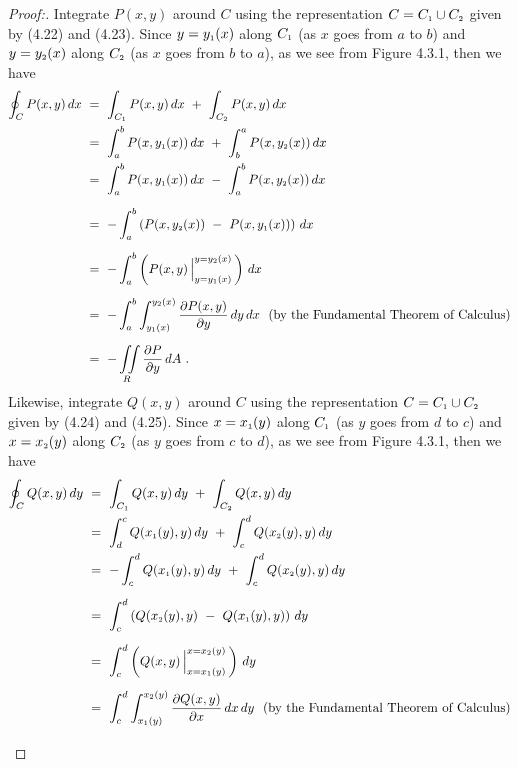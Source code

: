 \begin{proofbar}
\begin{proof}[Proof:]
 \par\noindent Integrate $P(x,y)$ around $C$ using the representation $C = C_{\scriptscriptstyle 1} \cup C_{\scriptscriptstyle 2}$ given by (4.22)
 and (4.23).
\newpage
\noindent Since $y = y_{\scriptscriptstyle 1}(x)$ along $C_{\scriptscriptstyle 1}$ (as $x$ goes from $a$ to $b$) and $y = y_{\scriptscriptstyle 2}(x)$ along
 $C_{\scriptscriptstyle 2}$ (as $x$ goes from $b$ to $a$), as we see from Figure 4.3.1, then we have
 \begin{align*}
  \oint_C P(x,y)\,dx ~&=~ \int_{C_{\scriptscriptstyle 1}} P(x,y)\,dx ~+~ \int_{C_{\scriptscriptstyle 2}} P(x,y)\,dx\\
   &=~ \int_a^b P(x,y_{\scriptscriptstyle 1}(x))\,dx ~+~ \int_b^a P(x,y_{\scriptscriptstyle 2}(x))\,dx\\
   &=~ \int_a^b P(x,y_{\scriptscriptstyle 1}(x))\,dx ~-~ \int_a^b P(x,y_{\scriptscriptstyle 2}(x))\,dx\\[6pt]
   &=~ -\int_a^b \left( P(x,y_{\scriptscriptstyle 2}(x)) ~-~ P(x,y_{\scriptscriptstyle 1}(x)) \right)\,dx\\[6pt]
   &=~ -\int_a^b \left( P(x,y) \,\Big|_{y = y_{\scriptscriptstyle 1}(x)}^{y = y_{\scriptscriptstyle 2}(x)} \,\right)\,dx\\[6pt]
   &=~ -\int_a^b \int_{y_{\scriptscriptstyle 1}(x)}^{y_{\scriptscriptstyle 2}(x)} \frac{\partial P(x,y)}{\partial y}\,dy\,dx ~~\text{(by the
    Fundamental Theorem of Calculus)}\\[6pt]
   &=~ -\iint\limits_{R} \frac{\partial P}{\partial y}\,dA ~.
 \end{align*}
 Likewise, integrate $Q(x,y)$ around $C$ using the representation $C = C_{\scriptscriptstyle 1} \cup C_{\scriptscriptstyle 2}$ given by (4.24) and
 (4.25). Since $x = x_{\scriptscriptstyle 1}(y)$ along $C_{\scriptscriptstyle 1}$ (as $y$ goes from $d$ to $c$) and $x = x_{\scriptscriptstyle 2}(y)$ along
 $C_{\scriptscriptstyle 2}$ (as $y$ goes from $c$ to $d$), as we see from Figure 4.3.1, then we have
 \begin{align*}
  \oint_C Q(x,y)\,dy ~&=~ \int_{\ssub{C}{1}} Q(x,y)\,dy ~+~ \int_{\ssub{C}{2}} Q(x,y)\,dy\\
   &=~ \int_d^c Q(\ssub{x}{1}(y),y)\,dy ~+~ \int_c^d Q(\ssub{x}{2}(y),y)\,dy\\
   &=~ -\int_c^d Q(\ssub{x}{1}(y),y)\,dy ~+~ \int_c^d Q(\ssub{x}{2}(y),y)\,dy\\[6pt]
   &=~ \int_c^d \left( Q(\ssub{x}{2}(y),y) ~-~ Q(\ssub{x}{1}(y),y) \right)\,dy\\[6pt]
   &=~ \int_c^d \left( Q(x,y) \,\Big|_{x = \ssub{x}{1}(y)}^{x = \ssub{x}{2}(y)} \,\right)\,dy\\[6pt]
   &=~ \int_c^d \int_{\ssub{x}{1}(y)}^{\ssub{x}{2}(y)} \frac{\partial Q(x,y)}{\partial x}\,dx\,dy ~~\text{(by the
    Fundamental Theorem of Calculus)}\\[6pt]

\end{align*}
\end{proof}
\end{proofbar}
